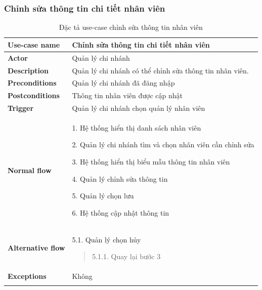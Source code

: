 \subsubsection{Chỉnh sửa thông tin chi tiết nhân viên}
{
    \setlength\extrarowheight{6pt}
    \begin{longtable}{| p{} | p{} |}
        \hline
        \textbf{Use-case name}
         &
        Chỉnh sửa thông tin chi tiết nhân viên
        \\
        \hline
        \textbf{Actor}
         &
        Quản lý chi nhánh
        \\
        \hline
        \textbf{Description}
         &
        Quản lý chi nhánh có thể chỉnh sửa thông tin nhân viên.
        \\
        \hline
        \textbf{Preconditions}
         &
        Quản lý chi nhánh đã đăng nhập
        \\
        \hline
        \textbf{Postconditions}
         &
        Thông tin nhân viên được cập nhật
        \\
        \hline
        \textbf{Trigger}
         &
        Quản lý chi nhánh chọn quản lý nhân viên
        \\
        \hline
        \begin{flushleft}
            \textbf{Normal flow}
        \end{flushleft}
         &
        1. Hệ thống hiển thị danh sách  nhân viên

        2. Quản lý chi nhánh tìm và chọn nhân viên cần chỉnh sửa

        3. Hệ thống hiển thị biểu mẫu thông tin nhân viên

        4. Quản lý chỉnh sửa thông tin

        5. Quản lý chọn lưu

        6. Hệ thống cập nhật thông tin
        \\
        \hline
        \begin{flushleft}
            \textbf{Alternative flow}
        \end{flushleft}
         &
        5.1. Quản lý chọn hủy
        \begin{quote}
            5.1.1. Quay lại bước 3
        \end{quote}
        \\
        \hline
        \textbf{Exceptions}
         &
        Không
        \\
        \hline
        \caption{Đặc tả use-case chỉnh sửa thông tin nhân viên}
    \end{longtable}
}


